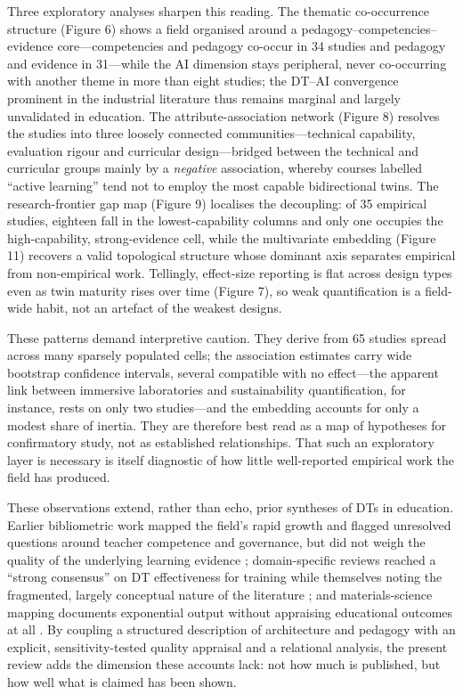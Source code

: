 Three exploratory analyses sharpen this reading. The thematic co-occurrence
structure (Figure 6) shows a field organised around a pedagogy--competencies--
evidence core---competencies and pedagogy co-occur in 34 studies and pedagogy and
evidence in 31---while the AI dimension stays peripheral, never co-occurring with
another theme in more than eight studies; the DT--AI convergence prominent in the
industrial literature \cite{chen_ai-enhanced_2025,liu_cognitive_2025} thus remains marginal
and largely unvalidated in education. The
attribute-association network (Figure 8) resolves the studies into three loosely
connected communities---technical capability, evaluation rigour and curricular
design---bridged between the technical and curricular groups mainly by a \emph{negative}
association, whereby courses labelled ``active learning'' tend not to employ the
most capable bidirectional twins. The research-frontier gap map (Figure 9)
localises the decoupling: of 35 empirical studies, eighteen fall in the lowest-capability
columns and only one occupies the high-capability, strong-evidence cell, while the
multivariate embedding (Figure 11) recovers a valid topological structure whose
dominant axis separates empirical from non-empirical work. Tellingly, effect-size
reporting is flat across design types even as twin maturity rises over time
(Figure 7), so weak quantification is a field-wide habit, not an artefact
of the weakest designs.

These patterns demand interpretive caution. They derive from 65 studies spread
across many sparsely populated cells; the association estimates carry wide
bootstrap confidence intervals, several compatible with no effect---the apparent
link between immersive laboratories and sustainability quantification, for
instance, rests on only two studies---and the embedding accounts for only a modest
share of inertia. They are therefore best read as a map of hypotheses for
confirmatory study, not as established relationships. That such an exploratory
layer is necessary is itself diagnostic of how little well-reported empirical work
the field has produced.

These observations extend, rather than echo, prior syntheses of DTs in education.
Earlier bibliometric work mapped the field's rapid growth and flagged unresolved
questions around teacher competence and governance, but did not weigh the quality
of the underlying learning evidence \cite{chamorro-atalaya_use_2024};
domain-specific reviews reached a ``strong consensus'' on DT effectiveness for
training while themselves noting the fragmented, largely conceptual nature of the
literature \cite{omrany_digital_2026}; and materials-science mapping documents
exponential output without appraising educational outcomes at all
\cite{vergara_decade_2025}. By coupling a structured description of architecture and
pedagogy with an explicit, sensitivity-tested quality appraisal and a relational
analysis, the present review adds the dimension these accounts lack: not how much
is published, but how well what is claimed has been shown.

